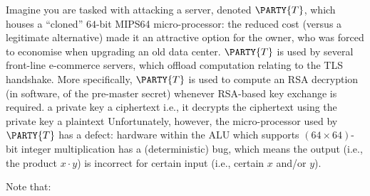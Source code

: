 %



Imagine you are tasked with attacking a server, denoted 
$\PARTY{T}$, 
which houses a ``cloned'' $64$-bit MIPS64 micro-processor: the reduced cost 
(versus a legitimate alternative) 
made it an attractive option for the owner, who was forced to economise when
upgrading an old data center.
$\PARTY{T}$ 
is used by several front-line e-commerce servers, which offload computation 
relating to the TLS handshake.  More specifically, 
$\PARTY{T}$ 
is used to compute an RSA decryption (in software, of the pre-master secret)
whenever RSA-based key exchange is required.
\DESCINTRO[none]
{}
{a private key}
{a ciphertext}
{i.e., it decrypts the ciphertext using the private key}
{a  plaintext}
Unfortunately, however, the micro-processor used by 
$\PARTY{T}$ 
has a defect: hardware within the ALU which supports $( 64 \times 64 )$-bit 
integer multiplication has a (deterministic) bug, which means
the    output (i.e., the product $x \cdot y$)
is incorrect for 
certain input (i.e., certain $x$ and/or $y$).




%
Note that:


